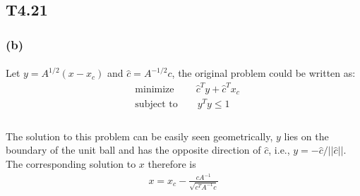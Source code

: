 \subsection*{T4.21}
\subsubsection*{(b)}
\paragraph{}
Let $y = A^{1/2}(x-x_c)$ and $\hat{c} = A^{-1/2}c$, the original problem could be written as:
\begin{align*}
&\text{minimize} \qquad\ \hat{c}^Ty +\hat{c}^Tx_c\\
&\text{subject to} \qquad y^Ty \leq 1\\
\end{align*}
\paragraph{}
The solution to this problem can be easily seen geometrically, $y$ lies on the boundary of the unit ball and has the opposite direction of $\hat{c}$, i.e., $y=-\hat{c}/ ||\hat{c}||$. The corresponding solution to $x$ therefore is
\begin{align*}
x = x_c - \frac{cA^{-1}}{\sqrt{c^TA^{-1}c}}
\end{align*}